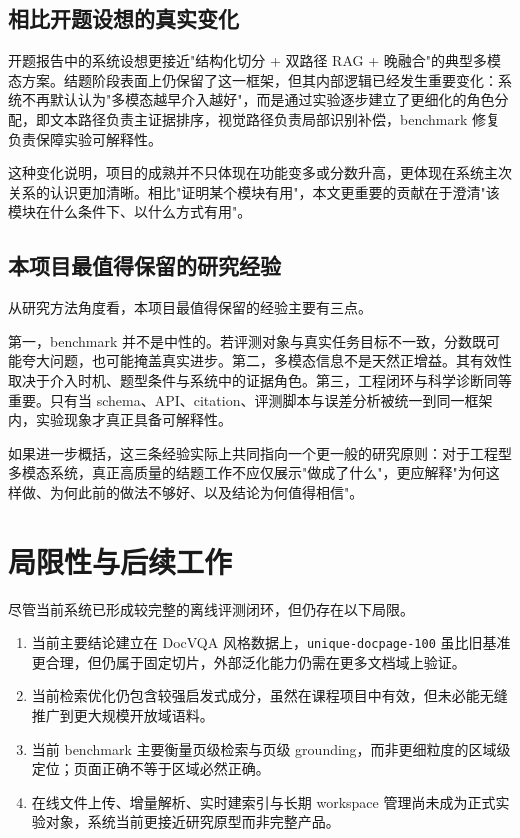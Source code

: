 \documentclass{SYSUReport}
\begin{document}
\subsection{相比开题设想的真实变化}

开题报告中的系统设想更接近"结构化切分 + 双路径 RAG + 晚融合"的典型多模态方案。结题阶段表面上仍保留了这一框架，但其内部逻辑已经发生重要变化：系统不再默认认为"多模态越早介入越好"，而是通过实验逐步建立了更细化的角色分配，即文本路径负责主证据排序，视觉路径负责局部识别补偿，benchmark 修复负责保障实验可解释性。

这种变化说明，项目的成熟并不只体现在功能变多或分数升高，更体现在系统主次关系的认识更加清晰。相比"证明某个模块有用"，本文更重要的贡献在于澄清"该模块在什么条件下、以什么方式有用"。

\subsection{本项目最值得保留的研究经验}

从研究方法角度看，本项目最值得保留的经验主要有三点。

第一，benchmark 并不是中性的。若评测对象与真实任务目标不一致，分数既可能夸大问题，也可能掩盖真实进步。第二，多模态信息不是天然正增益。其有效性取决于介入时机、题型条件与系统中的证据角色。第三，工程闭环与科学诊断同等重要。只有当 schema、API、citation、评测脚本与误差分析被统一到同一框架内，实验现象才真正具备可解释性。

如果进一步概括，这三条经验实际上共同指向一个更一般的研究原则：对于工程型多模态系统，真正高质量的结题工作不应仅展示"做成了什么"，更应解释"为何这样做、为何此前的做法不够好、以及结论为何值得相信"。

\section{局限性与后续工作}

尽管当前系统已形成较完整的离线评测闭环，但仍存在以下局限。

\begin{enumerate}
    \item 当前主要结论建立在 DocVQA 风格数据上，\texttt{unique-docpage-100} 虽比旧基准更合理，但仍属于固定切片，外部泛化能力仍需在更多文档域上验证。
    \item 当前检索优化仍包含较强启发式成分，虽然在课程项目中有效，但未必能无缝推广到更大规模开放域语料。
    \item 当前 benchmark 主要衡量页级检索与页级 grounding，而非更细粒度的区域级定位；页面正确不等于区域必然正确。
    \item 在线文件上传、增量解析、实时建索引与长期 workspace 管理尚未成为正式实验对象，系统当前更接近研究原型而非完整产品。
\end{enumerate}
\end{document}
